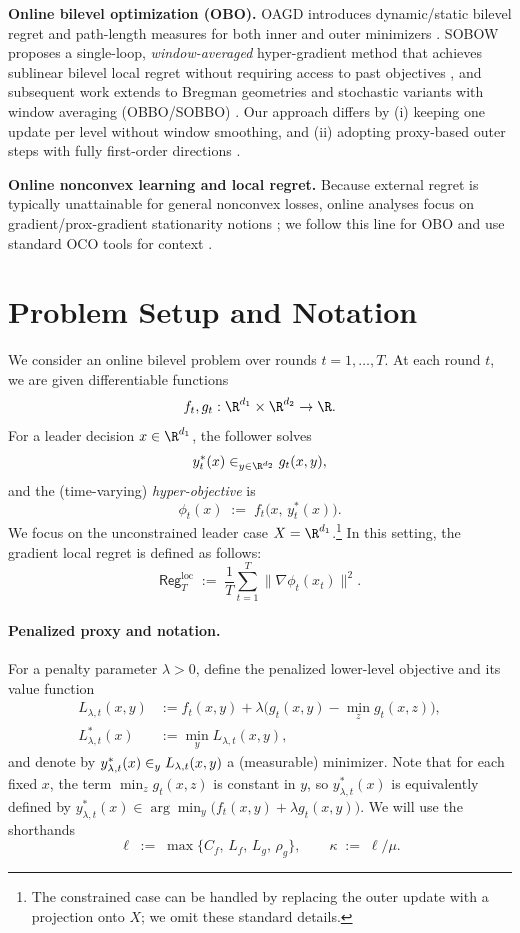 \documentclass{uai2026} %
\let\argmin\relax
\DeclareMathOperator*{\argmin}{arg\,min}
\newcommand{\Reg}{\mathsf{Reg}}
\begin{document}
\textbf{Online bilevel optimization (OBO).}
OAGD introduces dynamic/static bilevel regret and path-length measures for both inner and outer minimizers \citep{ataee2024oagd}. 
SOBOW proposes a single-loop, \emph{window-averaged} hyper-gradient method that achieves sublinear bilevel local regret without requiring access to past objectives \citep{lin2023sobow}, and subsequent work extends to Bregman geometries and stochastic variants with window averaging (OBBO/SOBBO) \citep{bohne2024sobbo}. 
Our approach differs by (i) keeping one update per level without window smoothing, and (ii) adopting proxy-based outer steps with fully first-order directions \citep{chen2025fullyfirstorder}.

\textbf{Online nonconvex learning and local regret.}
Because external regret is typically unattainable for general nonconvex losses, online analyses focus on gradient/prox-gradient stationarity notions \citep{hallak2021prox,heliou2020imperfect,heliou2021zeroth}; we follow this line for OBO and use standard OCO tools for context \citep{hazan2016oco}.


\section{Problem Setup and Notation}
\label{sec:setup}

We consider an online bilevel problem over rounds $t=1,\ldots,T$. At each round $t$, we are given differentiable functions
\[
f_t,g_t:\R^{d_1}\times\R^{d_2}\to\R.
\]
For a leader decision $x\in\R^{d_1}$, the follower solves
\[
y_t^{*}(x)\in\argmin_{y\in\R^{d_2}} g_t(x,y),
\]
and the (time-varying) \emph{hyper-objective} is
\[
\phi_t(x)\;:=\; f_t\!\big(x,\,y_t^{*}(x)\big).
\]
We focus on the unconstrained leader case $X=\R^{d_1}$.\footnote{The constrained case can be handled by replacing the outer update with a projection onto $X$; we omit these standard details.} In this setting, the gradient local regret is defined as follows:
\begin{equation}
\label{eq:local-regret}
\Reg^{\text{loc}}_T\;:=\;\frac1T\sum_{t=1}^T \big\|\nabla \phi_t(x_t)\big\|^2.
\end{equation}

\paragraph{Penalized proxy and notation.}
For a penalty parameter $\lambda>0$, define the penalized lower-level objective and its value function
\begin{align}
L_{\lambda,t}(x,y)&:= f_t(x,y)+\lambda\Big(g_t(x,y)-\min_{z} g_t(x,z)\Big),\\
L^{*}_{\lambda,t}(x)&:= \min_{y} L_{\lambda,t}(x,y),
\end{align}
and denote by $y^{*}_{\lambda,t}(x)\in\argmin_{y}L_{\lambda,t}(x,y)$ a (measurable) minimizer.
Note that for each fixed $x$, the term $\min_z g_t(x,z)$ is constant in $y$, so $y^{*}_{\lambda,t}(x)$ is equivalently defined by
$y^{*}_{\lambda,t}(x)\in\arg\min_y \bigl(f_t(x,y)+\lambda g_t(x,y)\bigr)$.
We will use the shorthands
\[
\ell\;:=\;\max\{C_f,\,L_f,\,L_g,\,\rho_g\},\qquad \kappa\;:=\;\ell/\mu.
\]
\end{document}
